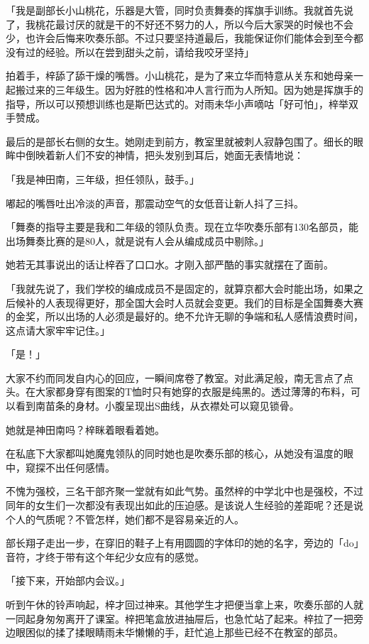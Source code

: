 \documentclass[UTF8]{ctexart}
\begin{document}
    「我是副部长小山桃花，乐器是大管，同时负责舞奏的挥旗手训练。我就首先说了，我桃花最讨厌的就是干的不好还不努力的人，所以今后大家哭的时候也不会少，也许会后悔来吹奏乐部。不过只要坚持道最后，我能保证你们能体会到至今都没有过的经验。所以在尝到甜头之前，请给我咬牙坚持」

    拍着手，梓舔了舔干燥的嘴唇。小山桃花，是为了来立华而特意从关东和她母亲一起搬过来的三年级生。因为好胜的性格和冲人言行而为人所知。因为她是挥旗手的指导，所以可以预想训练也是斯巴达式的。对雨未华小声嘀咕「好可怕」，梓举双手赞成。

    最后的是部长右侧的女生。她刚走到前方，教室里就被刺人寂静包围了。细长的眼眸中倒映着新人们不安的神情，把头发别到耳后，她面无表情地说：

    「我是神田南，三年级，担任领队，鼓手。」

    嘟起的嘴唇吐出冷淡的声音，那震动空气的女低音让新人抖了三抖。

    「舞奏的指导主要是我和二年级的领队负责。现在立华吹奏乐部有130名部员，能出场舞奏比赛的是80人，就是说有人会从编成成员中剔除。」

    她若无其事说出的话让梓吞了口口水。才刚入部严酷的事实就摆在了面前。

    「我就先说了，我们学校的编成成员不是固定的，就算京都大会时能出场，如果之后候补的人表现得更好，那全国大会时人员就会变更。我们的目标是全国舞奏大赛的金奖，所以出场的人必须是最好的。绝不允许无聊的争端和私人感情浪费时间，这点请大家牢牢记住。」

    「是！」

    大家不约而同发自内心的回应，一瞬间席卷了教室。对此满足般，南无言点了点头。在大家都身穿有图案的T恤时只有她穿的衣服是纯黑的。透过薄薄的布料，可以看到南苗条的身材。小腹呈现出S曲线，从衣襟处可以窥见锁骨。

    她就是神田南吗？梓眯着眼看着她。

    在私底下大家都叫她魔鬼领队的同时她也是吹奏乐部的核心，从她没有温度的眼中，窥探不出任何感情。

    不愧为强校，三名干部齐聚一堂就有如此气势。虽然梓的中学北中也是强校，不过同年的女生们一次都没有表现出如此的压迫感。是该说人生经验的差距呢？还是说个人的气质呢？不管怎样，她们都不是容易亲近的人。

    部长翔子走出一步，在穿旧的鞋子上有用圆圆的字体印的她的名字，旁边的「do」音符，才终于带有这个年纪少女应有的感觉。

    「接下来，开始部内会议。」

    听到午休的铃声响起，梓才回过神来。其他学生才把便当拿上来，吹奏乐部的人就一同起身匆匆离开了课室。梓把笔盒放进抽屉后，也急忙站了起来。梓拉了一把旁边眼困似的揉了揉眼睛雨未华懒懒的手，赶忙追上那些已经不在教室的部员。
\end{document}
